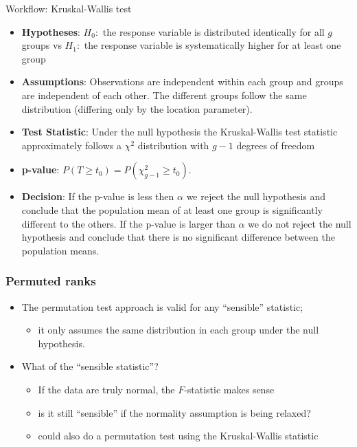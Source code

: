 \documentclass[a4paper]{article}
\begin{document}
\begin{redbox}{Workflow: Kruskal-Wallis test}
	\begin{itemize}
		\item \textbf{Hypotheses}: \( H_0: \) the response variable is distributed identically for all \( g \) groups vs \( H_1: \) the response variable is systematically higher for at least one group
		\item \textbf{Assumptions}: Observations are independent within each group and groups are independent of each other. The different groups follow the same distribution (differing only by the location parameter).
		\item \textbf{Test Statistic}:  Under the null hypothesis the Kruskal-Wallis test statistic approximately follows a \( \chi^2 \) distribution with \( g - 1 \) degrees of freedom
		\item \textbf{p-value}: \( P (T \geq t_0) = P(\chi^{2}_{g-1} \geq t_0) \).
		\item \textbf{Decision}: If the p-value is less then \( \alpha \) we reject the null hypothesis and conclude that the population mean of at least one group is significantly different to the others. If the p-value is larger than \( \alpha \) we do not reject the null hypothesis and conclude that there is no significant difference between the population means.
	\end{itemize}
\end{redbox}
\subsubsection{Permuted ranks}
\begin{itemize}
	\item The permutation test approach is valid for any ``sensible'' statistic;
	\begin{itemize}
		\item it only assumes the same distribution in each group under the null hypothesis.
	\end{itemize}
	\item What of the ``sensible statistic''?
	\begin{itemize}
		\item If the data are truly normal, the \( F \)-statistic makes sense
		\item is it still ``sensible'' if the normality assumption is being relaxed?
		\item could also do a permutation test using the Kruskal-Wallis statistic
	\end{itemize}
\end{itemize}
\end{document}
